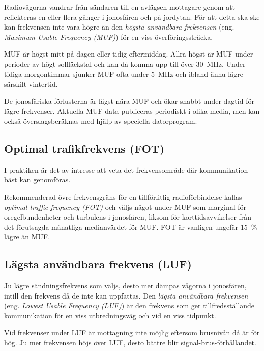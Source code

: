Radiovågorna vandrar från sändaren till en avlägsen mottagare genom
att reflekteras en eller flera gånger i jonosfären och på jordytan.
För att detta ska ske kan frekvensen inte vara högre än den
\emph{högsta användbara frekvensen} (eng. \emph{Maximum Usable Frequency (MUF)})
för en viss överföringssträcka.

MUF är högst mitt på dagen eller tidig eftermiddag.
Allra högst är MUF under perioder av högt solfläckstal och kan då komma
upp till över \SI{30}{\mega\hertz}.
Under tidiga morgontimmar sjunker MUF ofta under \SI{5}{\mega\hertz} och ibland
ännu lägre särskilt vintertid.

De jonosfäriska förlusterna är lägst nära MUF och ökar snabbt under
dagtid för lägre frekvenser.
Aktuella MUF-data publiceras periodiskt i olika media, men kan också
överslagsberäknas med hjälp av speciella datorprogram.

\subsection{Optimal trafikfrekvens (FOT)}

I praktiken är det av intresse att veta det frekvensområde där
kommunikation bäst kan genomföras.

Rekommenderad övre frekvensgräns för en tillförlitlig radioförbindelse
kallas \emph{optimal traffic frequency (FOT)} och väljs något under
MUF som marginal för oregelbundenheter och turbulens i jonosfären,
liksom för korttidsavvikelser från det förutsagda månatliga
medianvärdet för MUF.
FOT är vanligen ungefär \SI{15}{\percent} lägre än MUF.

\subsection{Lägsta användbara frekvens (LUF)}

Ju lägre sändningsfrekvens som väljs, desto mer dämpas vågorna i
jonosfären, intill den frekvens då de inte kan uppfattas.
Den \emph{lägsta användbara frekvensen}
(eng. \emph{Lowest Usable Frequency (LUF)}) är den
frekvens som ger tillfredsställande kommunikation för en viss
utbredningsväg och vid en viss tidpunkt.

Vid frekvenser under LUF är mottagning inte möjlig eftersom brusnivån
då är för hög.
Ju mer frekvensen höjs över LUF, desto bättre blir signal-brus-förhållandet.

